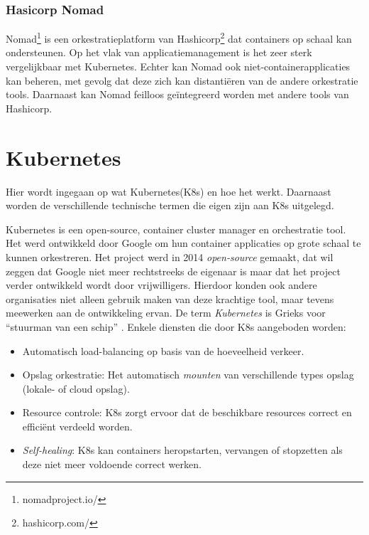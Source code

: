 \subsubsection{Hasicorp Nomad}
Nomad\footnote{nomadproject.io/} is een orkestratieplatform van Hashicorp\footnote{hashicorp.com/} dat containers op schaal kan ondersteunen. Op het vlak van applicatiemanagement is het zeer sterk vergelijkbaar met Kubernetes. Echter kan Nomad ook niet-containerapplicaties kan beheren, met gevolg dat deze zich kan distantiëren van de andere orkestratie tools. Daarnaast kan Nomad feilloos geïntegreerd worden met andere tools van Hashicorp.

\section{Kubernetes}
Hier wordt ingegaan op wat Kubernetes(K8s)  en hoe het werkt. Daarnaast worden de verschillende technische termen die eigen zijn aan K8s uitgelegd.

Kubernetes is een open-source, container cluster manager en orchestratie tool. Het werd ontwikkeld door Google om hun container applicaties op grote schaal te kunnen orkestreren. Het project werd in 2014 \textit{open-source} gemaakt, dat wil zeggen dat Google niet meer rechtstreeks de eigenaar is maar dat het project verder ontwikkeld wordt door vrijwilligers. Hierdoor konden ook andere organisaties niet alleen gebruik maken van deze krachtige tool, maar tevens meewerken aan de ontwikkeling ervan. De term \textit{Kubernetes} is Grieks voor ``stuurman van een schip'' \autocite{Kubernetes2021}. Enkele diensten die door K8s aangeboden worden:
\begin{itemize}
    \item Automatisch load-balancing op basis van de hoeveelheid verkeer.
    \item Opslag orkestratie: Het automatisch \textit{mounten} van verschillende types opslag (lokale- of cloud opslag).
    \item Resource controle: K8s zorgt ervoor dat de beschikbare resources correct en efficiënt verdeeld worden.
    \item \textit{Self-healing}: K8s kan containers heropstarten, vervangen of stopzetten als deze niet meer voldoende correct werken.
\end{itemize}

